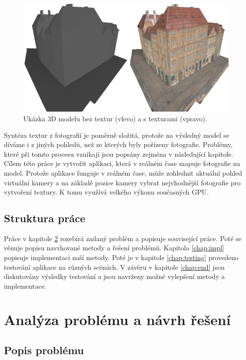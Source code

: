 \documentclass[11pt,twoside,a4paper]{book}
\begin{document}
\begin{figure}[h]
\begin{center}
\includegraphics[width=\textwidth]{figures/example}
\caption{Ukázka 3D modelu bez textur (vlevo) a s texturami (vpravo).}
\label{fig:example}
\end{center}
\end{figure}

Syntéza textur z fotografií je poměrně složitá, protože 	na výsledný model se díváme i z jiných pohledů, než ze kterých byly pořízeny fotografie. Problémy, které při tomto procesu vznikají jsou popsány zejména v následující kapitole. Cílem této práce je vytvořit aplikaci, která v reálném čase mapuje fotografie na model. Protože aplikace funguje v reálném čase, může zohlednit aktuální pohled virtuální kamery a na základě pozice kamery vybrat nejvhodnější fotografie pro vytvoření textury. K tomu využívá velkého výkonu současných GPU.

\newpage
\section{Struktura práce}

Práce v kapitole \ref{chap:analysis} rozebírá zadaný problém a popisuje související práce. Poté se věnuje popisu navrhované metody a řešení problémů. Kapitola \ref{chap:impl} popisuje implementaci naší metody. Poté je v kapitole \ref{chap:testing} provedeno testování aplikace na různých scénách. V závěru v kapitole \ref{chap:end} jsou diskutovány výsledky testování a jsou navrženy možné vylepšení metody a implementace.

\chapter{Analýza problému a návrh řešení}
\label{chap:analysis}
\section{Popis problému}
\end{document}
